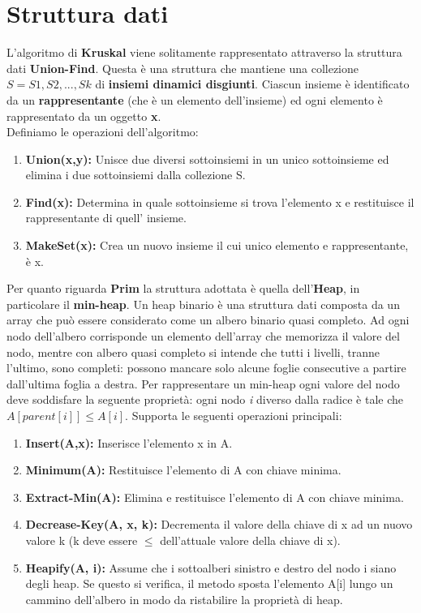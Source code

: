 \documentclass{article}
\begin{document}
\section{Struttura dati}
L'algoritmo di \textbf{Kruskal} viene solitamente rappresentato attraverso la struttura dati \textbf{Union-Find}. Questa è una struttura che mantiene una collezione $S = { S1 , S2 , ..., Sk }$ di \textbf{insiemi dinamici disgiunti}.
Ciascun insieme è identificato da un \textbf{rappresentante} (che è un elemento dell’insieme) ed ogni elemento è rappresentato da un oggetto \textbf{x}.\\
Definiamo le operazioni dell'algoritmo:
\begin{enumerate}[label={\roman*.)}, ref={\roman*.)}]
    \item \textbf{Union(x,y):} Unisce due diversi sottoinsiemi in un unico sottoinsieme ed elimina i due sottoinsiemi dalla collezione S.
    \item \textbf{Find(x):} Determina in quale sottoinsieme si trova l'elemento x e restituisce il rappresentante di quell' insieme.
    \item \textbf{MakeSet(x):} Crea un nuovo insieme il cui unico elemento e rappresentante, è x.
\end{enumerate}

Per quanto riguarda \textbf{Prim} la struttura adottata è quella dell'\textbf{Heap}, in particolare il \textbf{min-heap}. Un heap binario è una struttura dati composta da un array che può essere considerato come un albero binario quasi completo. Ad ogni nodo dell’albero corrisponde un elemento dell’array che memorizza il valore del nodo, mentre con albero quasi completo si intende che tutti i livelli, tranne l’ultimo, sono completi: possono mancare solo alcune foglie consecutive a partire dall’ultima foglia a destra.
Per rappresentare un min-heap ogni valore del nodo deve soddisfare la seguente proprietà: ogni nodo \textit{i} diverso dalla radice è tale che $A[parent[i]] \leq A[i].$
Supporta le seguenti operazioni principali:
\begin{enumerate}[label={\roman*.)}, ref={\roman*.)}]
    \item \textbf{Insert(A,x):} Inserisce l'elemento x in A.
    \item \textbf{Minimum(A):} Restituisce l’elemento di A con chiave minima.
    \item \textbf{Extract-Min(A):} Elimina e restituisce l’elemento di A con chiave minima.
    \item \textbf{Decrease-Key(A, x, k):} Decrementa il valore della chiave di x ad un nuovo valore k (k deve essere $\leq$ dell’attuale valore della chiave di x).
    \item \textbf{Heapify(A, i):} Assume che i sottoalberi sinistro e destro del nodo i siano degli heap. Se questo si verifica, il metodo sposta l’elemento A[i] lungo un cammino dell’albero in modo da ristabilire la proprietà di heap.
\end{enumerate}
\end{document}
